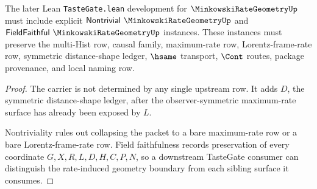 \begin{theorem}
\label{thm:minkowski-rate-geometry-tastegate-obligation}
The later Lean \texttt{TasteGate.lean} development for $\MinkowskiRateGeometryUp$ must include explicit $\mathsf{Nontrivial}\ \MinkowskiRateGeometryUp$ and $\mathsf{FieldFaithful}\ \MinkowskiRateGeometryUp$ instances. These instances must preserve the multi-Hist row, causal family, maximum-rate row, Lorentz-frame-rate row, symmetric distance-shape ledger, $\hsame$ transport, $\Cont$ routes, package provenance, and local naming row.
\end{theorem}
\begin{proof}
The carrier is not determined by any single upstream row. It adds $D$, the symmetric distance-shape ledger, after the observer-symmetric maximum-rate surface has already been exposed by $L$.

Nontriviality rules out collapsing the packet to a bare maximum-rate row or a bare Lorentz-frame-rate row. Field faithfulness records preservation of every coordinate $G,X,R,L,D,H,C,P,N$, so a downstream TasteGate consumer can distinguish the rate-induced geometry boundary from each sibling surface it consumes.
\end{proof}

